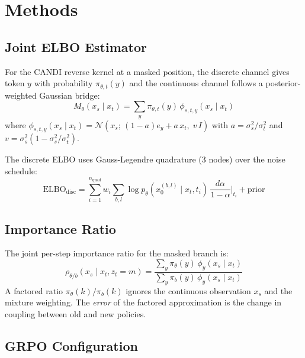 \documentclass{article}
\begin{document}
\section{Methods}

\subsection{Joint ELBO Estimator}

For the CANDI reverse kernel at a masked position, the discrete channel gives token $y$ with probability $\pi_{\theta,t}(y)$ and the continuous channel follows a posterior-weighted Gaussian bridge:
\begin{equation}
M_\theta(x_s \mid x_t) = \sum_y \pi_{\theta,t}(y)\,\phi_{s,t,y}(x_s \mid x_t)
\end{equation}
where $\phi_{s,t,y}(x_s\mid x_t) = \mathcal{N}(x_s;\, (1{-}a)e_y + a\,x_t,\; v\,I)$ with $a = \sigma_s^2/\sigma_t^2$ and $v = \sigma_s^2(1-\sigma_s^2/\sigma_t^2)$.

The discrete ELBO uses Gauss-Legendre quadrature (3 nodes) over the noise schedule:
\begin{equation}
\text{ELBO}_{\text{disc}} = \sum_{i=1}^{n_\text{quad}} w_i \sum_{b,l} \log p_\theta(x_0^{(b,l)} \mid x_t, t_i)\,\frac{d\alpha}{1-\alpha}\bigg|_{t_i} + \text{prior}
\end{equation}

\subsection{Importance Ratio}

The joint per-step importance ratio for the masked branch is:
\begin{equation}
\rho_{\theta/b}(x_s \mid x_t, z_t{=}m) = \frac{\sum_y \pi_\theta(y)\,\phi_y(x_s\mid x_t)}{\sum_y \pi_b(y)\,\phi_y(x_s\mid x_t)}
\end{equation}
A factored ratio $\pi_\theta(k)/\pi_b(k)$ ignores the continuous observation $x_s$ and the mixture weighting. The \textit{error} of the factored approximation is the change in coupling between old and new policies.

\subsection{GRPO Configuration}
\end{document}
